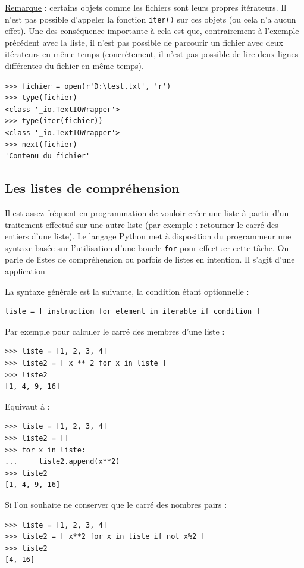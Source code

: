 \documentclass[12pt, a4paper]{article}
\begin{document}
\underline{Remarque} : certains objets comme les fichiers sont leurs propres itérateurs. Il n'est pas possible d'appeler la fonction \lstinline{iter()} sur ces objets (ou cela n'a aucun effet). Une des conséquence importante à cela est que, contrairement à l'exemple précédent avec la liste, il n'est pas possible de parcourir un fichier avec deux itérateurs en même temps (concrètement, il n'est pas possible de lire deux lignes différentes du fichier en même temps).
\begin{lstlisting}
>>> fichier = open(r'D:\test.txt', 'r')
>>> type(fichier)
<class '_io.TextIOWrapper'>
>>> type(iter(fichier))
<class '_io.TextIOWrapper'>
>>> next(fichier)
'Contenu du fichier'
\end{lstlisting}



\subsection{Les listes de compréhension}
Il est assez fréquent en programmation de vouloir créer une liste à partir d'un traitement effectué sur une autre liste (par exemple : retourner le carré des entiers d'une liste). Le langage Python met à disposition du programmeur une syntaxe basée sur l'utilisation d'une boucle \lstinline{for} pour effectuer cette tâche. On parle de listes de compréhension ou parfois de listes en intention. Il s'agit d'une application 

La syntaxe générale est la suivante, la condition étant optionnelle :
\begin{lstlisting}
liste = [ instruction for element in iterable if condition ]
\end{lstlisting}

Par exemple pour calculer le carré des membres d'une liste :
\begin{lstlisting}
>>> liste = [1, 2, 3, 4]
>>> liste2 = [ x ** 2 for x in liste ]
>>> liste2
[1, 4, 9, 16]
\end{lstlisting}

Equivaut à :
\begin{lstlisting}
>>> liste = [1, 2, 3, 4]
>>> liste2 = []
>>> for x in liste:
...		liste2.append(x**2)
>>> liste2
[1, 4, 9, 16]
\end{lstlisting}

Si l'on souhaite ne conserver que le carré des nombres pairs :
\begin{lstlisting}
>>> liste = [1, 2, 3, 4]
>>> liste2 = [ x**2 for x in liste if not x%2 ]
>>> liste2
[4, 16]
\end{lstlisting}
\end{document}
